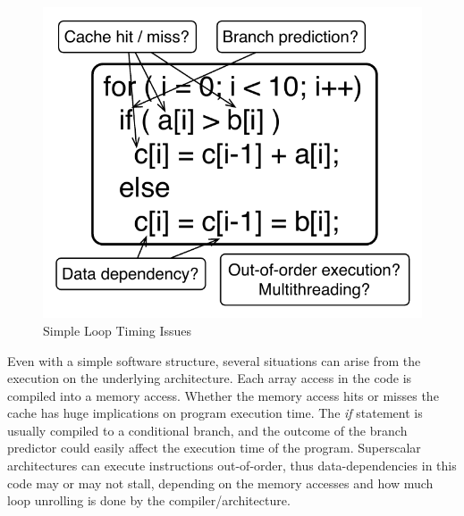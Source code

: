 \begin{figure}
  \vspace{-20pt}
  \begin{center}
    \includegraphics[scale=.6]{figs/simple_code_timing_issues}
  \end{center}
  \vspace{-10pt}
  \caption{Simple Loop Timing Issues}
  \label{fig:simple_code_timing_issues}
  \vspace{-10pt}
\end{figure}

Even with a simple software structure, several situations can arise from the execution on the underlying architecture. 
Each array access in the code is compiled into a memory access.
Whether the memory access hits or misses the cache has huge implications on program execution time.
The \emph{if} statement is usually compiled to a conditional branch, and the outcome of the branch predictor could easily affect the execution time of the program.
Superscalar architectures can execute instructions out-of-order, thus data-dependencies in this code may or may not stall, depending on the memory accesses and how much loop unrolling is done by the compiler/architecture.   


